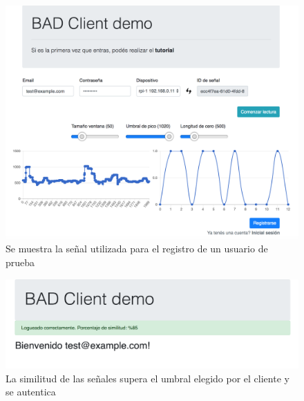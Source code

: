 \documentclass{article}
\begin{document}
\begin{figure}[ht]
    \centering
    \includegraphics[width=\textwidth]{success_1.png}%
    \caption{Se muestra la señal utilizada para el registro de un usuario de prueba}
    \label{fig:success-1}
\end{figure}

\begin{figure}[ht]
    \centering
    \includegraphics[width=\textwidth]{success_1_result.png}%
    \caption{La similitud de las señales supera el umbral elegido por el cliente y se autentica}
    \label{fig:success-2}
\end{figure}
\end{document}
